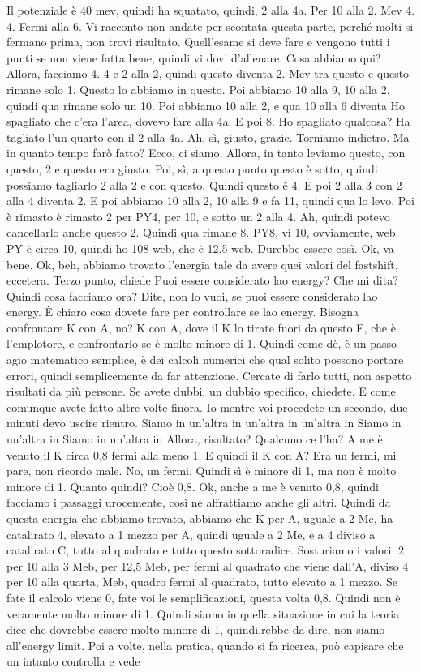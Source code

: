 \begin{soluzione}
{   Il potenziale è 40 mev, quindi ha squatato, quindi, 2 alla 4a. Per 10 alla 2. Mev 4. 4. Fermi alla 6. Vi racconto non andate per scontata questa parte, perché molti si fermano prima, non trovi risultato. Quell'esame si deve fare e vengono tutti i punti se non viene fatta bene, quindi vi dovi d'allenare. Cosa abbiamo qui? Allora, facciamo 4. 4 e 2 alla 2, quindi questo diventa 2. Mev tra questo e questo rimane solo 1. Questo lo abbiamo in questo. Poi abbiamo 10 alla 9, 10 alla 2, quindi qua rimane solo un 10. Poi abbiamo 10 alla 2, e qua 10 alla 6 diventa Ho spagliato che c'era l'area, dovevo fare alla 4a. E poi 8. Ho spagliato qualcosa? Ha tagliato l'un quarto con il 2 alla 4a. Ah, sì, giusto, grazie. Torniamo indietro. Ma in quanto tempo farò fatto? Ecco, ci siamo. Allora, in tanto leviamo questo, con questo, 2 e questo era giusto. Poi, sì, a questo punto questo è sotto, quindi possiamo tagliarlo 2 alla 2 e con questo. Quindi questo è 4. E poi 2 alla 3 con 2 alla 4 diventa 2. E poi abbiamo 10 alla 2, 10 alla 9 e fa 11, quindi qua lo levo. Poi è rimasto è rimasto 2 per PY4, per 10, e sotto un 2 alla 4. Ah, quindi potevo cancellarlo anche questo 2. Quindi qua rimane 8. PY8, vi 10, ovviamente, web. PY è circa 10, quindi ho 108 web, che è 12.5 web. Durebbe essere così. Ok, va bene. Ok, beh, abbiamo trovato l'energia tale da avere quei valori del fastshift, eccetera. Terzo punto, chiede Puoi essere considerato lao energy? Che mi dita? Quindi cosa facciamo ora? Dite, non lo vuoi, se puoi essere considerato lao energy. È chiaro cosa dovete fare per controllare se lao energy. Bisogna confrontare K con A, no? K con A, dove il K lo tirate fuori da questo E, che è l'emplotore, e confrontarlo se è molto minore di 1. Quindi come dè, è un passo agio matematico semplice, è dei calcoli numerici che qual solito possono portare errori, quindi semplicemente da far attenzione. Cercate di farlo tutti, non aspetto risultati da più persone. Se avete dubbi, un dubbio specifico, chiedete. E come comunque avete fatto altre volte finora. Io mentre voi procedete un secondo, due minuti devo uscire rientro. Siamo in un'altra in un'altra in un'altra in Siamo in un'altra in Siamo in un'altra in Allora, risultato? Qualcuno ce l'ha? A me è venuto il K circa 0,8 fermi alla meno 1. E quindi il K con A? Era un fermi, mi pare, non ricordo male. No, un fermi. Quindi sì è minore di 1, ma non è molto minore di 1. Quanto quindi? Cioè 0,8. Ok, anche a me è venuto 0,8, quindi facciamo i passaggi urocemente, così ne affrattiamo anche gli altri. Quindi da questa energia che abbiamo trovato, abbiamo che K per A, uguale a 2 Me, ha catalirato 4, elevato a 1 mezzo per A, quindi uguale a 2 Me, e a 4 diviso a catalirato C, tutto al quadrato e tutto questo sottoradice. Sosturiamo i valori. 2 per 10 alla 3 Meb, per 12,5 Meb, per fermi al quadrato che viene dall'A, diviso 4 per 10 alla quarta, Meb, quadro fermi al quadrato, tutto elevato a 1 mezzo. Se fate il calcolo viene 0, fate voi le semplificazioni, questa volta 0,8. Quindi non è veramente molto minore di 1. Quindi siamo in quella situazione in cui la teoria dice che dovrebbe essere molto minore di 1, quindi,rebbe da dire, non siamo all'energy limit. Poi a volte, nella pratica, quando si fa ricerca, può capisare che un intanto controlla e vede }
\end{soluzione}
